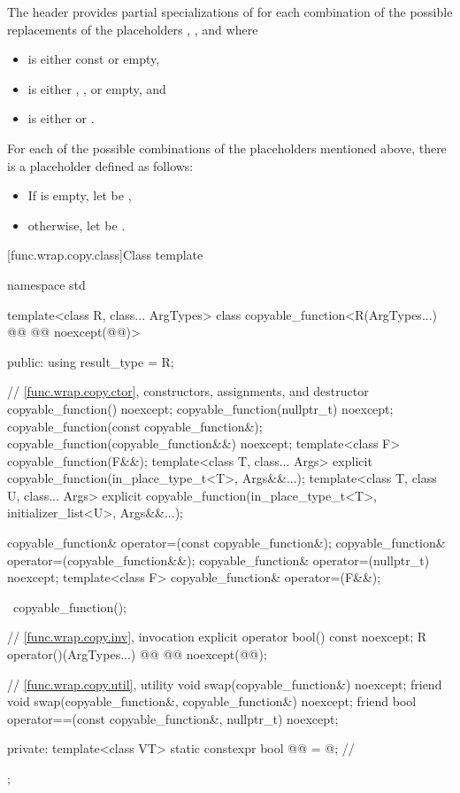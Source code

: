 \pnum
The header provides partial specializations of 
for each combination of the possible replacements
of the placeholders \cv{}, , and  where
\begin{itemize}
\item
\cv{} is either const or empty,
\item
{} is either \tcode{\&}, \tcode{\&\&}, or empty, and
\item
{} is either  or .
\end{itemize}

\pnum
For each of the possible combinations of the placeholders mentioned above,
there is a placeholder  defined as follows:
\begin{itemize}
\item
If  is empty, let  be \cv{}\tcode{\&},
\item
otherwise, let  be \cv{} .
\end{itemize}

[func.wrap.copy.class]{Class template }

%
\begin{codeblock}
namespace std {
  template<class R, class... ArgTypes>
  class copyable_function<R(ArgTypes...) @\cv{}@ @@ noexcept(@@)> {
  public:
    using result_type = R;

    // \ref{func.wrap.copy.ctor}, constructors, assignments, and destructor
    copyable_function() noexcept;
    copyable_function(nullptr_t) noexcept;
    copyable_function(const copyable_function&);
    copyable_function(copyable_function&&) noexcept;
    template<class F> copyable_function(F&&);
    template<class T, class... Args>
      explicit copyable_function(in_place_type_t<T>, Args&&...);
    template<class T, class U, class... Args>
      explicit copyable_function(in_place_type_t<T>, initializer_list<U>, Args&&...);

    copyable_function& operator=(const copyable_function&);
    copyable_function& operator=(copyable_function&&);
    copyable_function& operator=(nullptr_t) noexcept;
    template<class F> copyable_function& operator=(F&&);

    ~copyable_function();

    // \ref{func.wrap.copy.inv}, invocation
    explicit operator bool() const noexcept;
    R operator()(ArgTypes...) @\cv{}@ @@ noexcept(@@);

    // \ref{func.wrap.copy.util}, utility
    void swap(copyable_function&) noexcept;
    friend void swap(copyable_function&, copyable_function&) noexcept;
    friend bool operator==(const copyable_function&, nullptr_t) noexcept;

  private:
    template<class VT>
      static constexpr bool @@ = @\seebelow@;       // \expos
  };
}
\end{codeblock}

